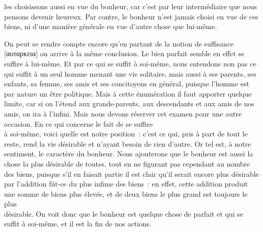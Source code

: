 \documentclass[french,twoside]{book} %
\begin{document}
les choisissons aussi en vue du bonheur, car c’est par leur intermédiaire que nous pensons devenir heureux. Par contre, le bonheur n’est jamais choisi en vue de ces biens, ni d’une manière générale en vue d’autre chose que lui-même.\par
On peut se rendre compte encore qu’en partant de la notion de suffisance [αυταρκεια] on arrive à la même conclusion. Le bien parfait semble en effet se suffire à lui-même. Et par ce qui se suffit à soi-même, nous entendons non pas ce qui suffit à un seul homme menant une vie solitaire, mais aussi à ses parents, ses \\
enfants, sa femme, ses amis et ses concitoyens en général, puisque l’homme est par nature un être politique. Mais à cette énumération il faut apporter quelque limite, car si on l’étend aux grands-parents, aux descendants et aux amis de nos amis, on ira à l’infini. Mais nous devons réserver cet examen pour une autre occasion. En ce qui concerne le fait de se suffire \\
à soi-même, voici quelle est notre position : c’est ce qui, pris à part de tout le reste, rend la vie désirable et n’ayant besoin de rien d’autre. Or tel est, à notre sentiment, le caractère du bonheur. Nous ajouterons que le bonheur est aussi la chose la plus désirable de toutes, tout en ne figurant pas cependant au nombre des biens, puisque s’il en faisait partie il est clair qu’il serait encore plus désirable par l’addition fût-ce du plus infime des biens : en effet, cette addition produit une somme de biens plus élevée, et de deux biens le plus grand est toujours le plus \\
désirable. On voit donc que le bonheur est quelque chose de parfait et qui se suffit à soi-même, et il est la fin de nos actions.
\end{document}
